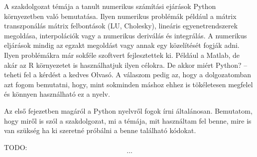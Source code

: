 
A szakdolgozat témája a tanult
numerikus számítási ejárások Python környezetben való bemutatása. Ilyen
numerikus problémák például a mátrix transzponálás mátrix felbontások
(LU, Cholesky), lineáris egyenetrendszerek megoldása, interpolációk vagy a numerikus deriválás és integrálás. A numerikus
eljárások mindig az egzakt megoldást vagy annak egy közelítését fogják adni.
Ilyen problémákra már sokféle szoftvert fejlesztettek ki. Például a
Matlab, de akár az R környezetet is használhatjuk ilyen célokra. De
akkor miért Python? -- teheti fel a kérdést a kedves Olvasó. A válaszom
pedig az, hogy a dolgozatomban azt fogom bemutatni, hogy, mint sokminden
máshoz ehhez is tökéletesen megfelel és könnyen használható ez a nyelv.

Az első fejezetben magáról a Python nyelvről fogok írni általánosan.
Bemutatom, hogy miről is szól a szakdolgozat, mi a témája, mit használtam fel benne,
mire is van szükség ha ki szeretné próbálni a benne található kódokat.

TODO:
\[
\ldots
\]